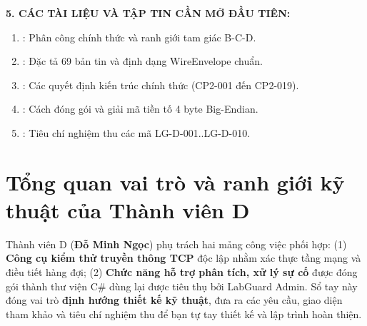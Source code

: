 \documentclass[12pt,a4paper]{article}
\begin{document}
\begin{tcolorbox}[enhanced, colback=lgLightSlate, colframe=lgSlate, boxrule=0.8pt, arc=1.5mm, top=1.8mm, bottom=1.8mm, left=2.5mm, right=2.5mm]
{\bfseries\color{lgSlate} 5. CÁC TÀI LIỆU VÀ TẬP TIN CẦN MỞ ĐẦU TIÊN:}\par
\vspace{0.5mm}
\begin{enumerate}[leftmargin=1.5em, itemsep=0.5pt, parsep=0pt, topsep=1pt]
  \item {}: Phân công chính thức và ranh giới tam giác B-C-D.
  \item {}: Đặc tả 69 bản tin và định dạng WireEnvelope chuẩn.
  \item {}: Các quyết định kiến trúc chính thức (CP2-001 đến CP2-019).
  \item {}: Cách đóng gói và giải mã tiền tố 4 byte Big-Endian.
  \item {}: Tiêu chí nghiệm thu các mã LG-D-001..LG-D-010.
\end{enumerate}
\end{tcolorbox}

\endgroup
\newpage

\setcounter{page}{3}

\setcounter{tocdepth}{2}
\renewcommand{\contentsname}{MỤC LỤC}
\tableofcontents
\newpage

\setcounter{page}{1}


\section{Tổng quan vai trò và ranh giới kỹ thuật của Thành viên D}

\begin{summarybox}
Thành viên D (\textbf{Đỗ Minh Ngọc}) phụ trách hai mảng công việc phối hợp: (1) \textbf{Công cụ kiểm thử truyền thông TCP} độc lập nhằm xác thực tầng mạng và điều tiết hàng đợi; (2) \textbf{Chức năng hỗ trợ phân tích, xử lý sự cố} được đóng gói thành thư viện C\# dùng lại được tiêu thụ bởi LabGuard Admin. Sổ tay này đóng vai trò \textbf{định hướng thiết kế kỹ thuật}, đưa ra các yêu cầu, giao diện tham khảo và tiêu chí nghiệm thu để bạn tự tay thiết kế và lập trình hoàn thiện.
\end{summarybox}
\end{document}
